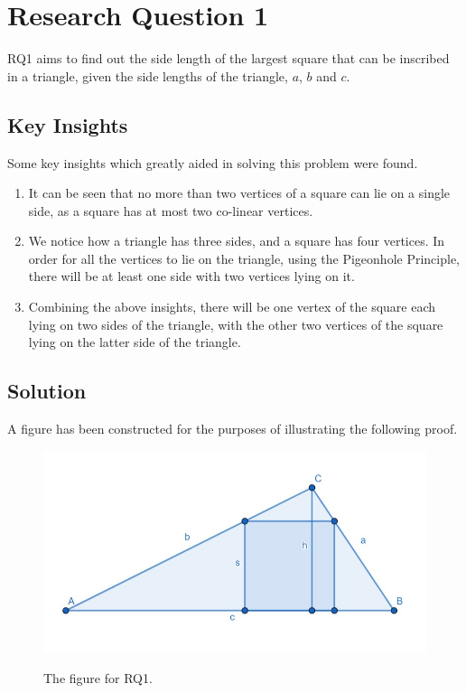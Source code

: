 \documentclass[12pt]{scrartcl}
\begin{document}
\section{Research Question 1}

RQ1 aims to find out the side length of the largest square that can be inscribed in a triangle,
given the side lengths of the triangle, $a$, $b$ and $c$.

\subsection{Key Insights}
Some key insights which greatly aided in solving this problem were found.
\begin{enumerate}
	\item It can be seen that no more than two vertices of a square can lie on a single side,
	      as a square has at most two co-linear vertices.
	\item We notice how a triangle has three sides, and a square has four vertices.
	      In order for all the vertices to lie on the triangle, using the Pigeonhole Principle,
	      there will be at least one side with two vertices lying on it.
	\item Combining the above insights, there will be one vertex of the square
	      each lying on two sides of the triangle, with the other two vertices of the square
	      lying on the latter side of the triangle.
\end{enumerate}

\subsection{Solution}
A figure has been constructed for the purposes of illustrating the following proof.
\begin{figure}[htpb]
	\centering
	\includegraphics[scale=.75]{images/rq1.jpg}
	\label{fig:rq1_img}
	\caption{The figure for RQ1.}
\end{figure}
\end{document}
